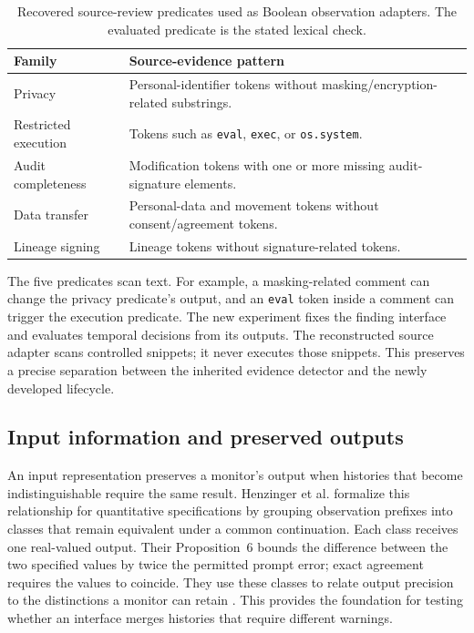 \documentclass[preprint,11pt]{elsarticle}
\newcommand{\code}[1]{\texttt{#1}}
\begin{document}
\begin{table}[ht]
\centering\small
\caption{Recovered source-review predicates used as Boolean observation adapters. The evaluated predicate is the stated lexical check.}\label{tab:recovery}
\begin{tabularx}{\linewidth}{@{}lX@{}}\toprule
Family & Source-evidence pattern \\\midrule
Privacy & Personal-identifier tokens without masking/encryption-related substrings.\\
Restricted execution & Tokens such as \code{eval}, \code{exec}, or \code{os.system}.\\
Audit completeness & Modification tokens with one or more missing audit-signature elements.\\
Data transfer & Personal-data and movement tokens without consent/agreement tokens.\\
Lineage signing & Lineage tokens without signature-related tokens.\\\bottomrule
\end{tabularx}
\end{table}

The five predicates scan text. For example, a masking-related comment can change the privacy predicate's output, and an \code{eval} token inside a comment can trigger the execution predicate. The new experiment fixes the finding interface and evaluates temporal decisions from its outputs. The reconstructed source adapter scans controlled snippets; it never executes those snippets. This preserves a precise separation between the inherited evidence detector and the newly developed lifecycle.

\subsection{Input information and preserved outputs}\label{sec:related-work}
An input representation preserves a monitor's output when histories that become indistinguishable require the same result. Henzinger et al. formalize this relationship for quantitative specifications by grouping observation prefixes into classes that remain equivalent under a common continuation. Each class receives one real-valued output. Their Proposition~6 bounds the difference between the two specified values by twice the permitted prompt error; exact agreement requires the values to coincide. They use these classes to relate output precision to the distinctions a monitor can retain \cite{henzinger2022abstract}. This provides the foundation for testing whether an interface merges histories that require different warnings.
\end{document}
